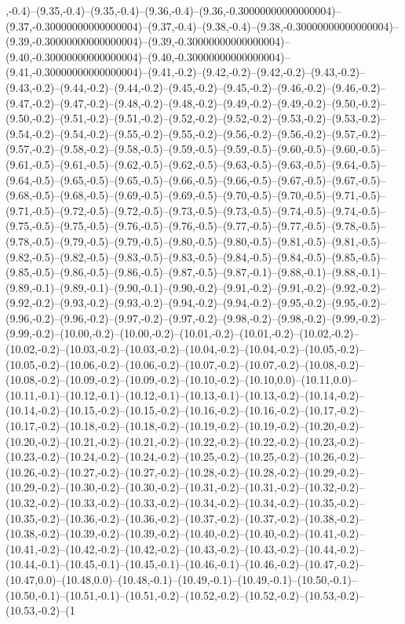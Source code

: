 ,-0.4)--(9.35,-0.4)--(9.35,-0.4)--(9.36,-0.4)--(9.36,-0.30000000000000004)--(9.37,-0.30000000000000004)--(9.37,-0.4)--(9.38,-0.4)--(9.38,-0.30000000000000004)--(9.39,-0.30000000000000004)--(9.39,-0.30000000000000004)--(9.40,-0.30000000000000004)--(9.40,-0.30000000000000004)--(9.41,-0.30000000000000004)--(9.41,-0.2)--(9.42,-0.2)--(9.42,-0.2)--(9.43,-0.2)--(9.43,-0.2)--(9.44,-0.2)--(9.44,-0.2)--(9.45,-0.2)--(9.45,-0.2)--(9.46,-0.2)--(9.46,-0.2)--(9.47,-0.2)--(9.47,-0.2)--(9.48,-0.2)--(9.48,-0.2)--(9.49,-0.2)--(9.49,-0.2)--(9.50,-0.2)--(9.50,-0.2)--(9.51,-0.2)--(9.51,-0.2)--(9.52,-0.2)--(9.52,-0.2)--(9.53,-0.2)--(9.53,-0.2)--(9.54,-0.2)--(9.54,-0.2)--(9.55,-0.2)--(9.55,-0.2)--(9.56,-0.2)--(9.56,-0.2)--(9.57,-0.2)--(9.57,-0.2)--(9.58,-0.2)--(9.58,-0.5)--(9.59,-0.5)--(9.59,-0.5)--(9.60,-0.5)--(9.60,-0.5)--(9.61,-0.5)--(9.61,-0.5)--(9.62,-0.5)--(9.62,-0.5)--(9.63,-0.5)--(9.63,-0.5)--(9.64,-0.5)--(9.64,-0.5)--(9.65,-0.5)--(9.65,-0.5)--(9.66,-0.5)--(9.66,-0.5)--(9.67,-0.5)--(9.67,-0.5)--(9.68,-0.5)--(9.68,-0.5)--(9.69,-0.5)--(9.69,-0.5)--(9.70,-0.5)--(9.70,-0.5)--(9.71,-0.5)--(9.71,-0.5)--(9.72,-0.5)--(9.72,-0.5)--(9.73,-0.5)--(9.73,-0.5)--(9.74,-0.5)--(9.74,-0.5)--(9.75,-0.5)--(9.75,-0.5)--(9.76,-0.5)--(9.76,-0.5)--(9.77,-0.5)--(9.77,-0.5)--(9.78,-0.5)--(9.78,-0.5)--(9.79,-0.5)--(9.79,-0.5)--(9.80,-0.5)--(9.80,-0.5)--(9.81,-0.5)--(9.81,-0.5)--(9.82,-0.5)--(9.82,-0.5)--(9.83,-0.5)--(9.83,-0.5)--(9.84,-0.5)--(9.84,-0.5)--(9.85,-0.5)--(9.85,-0.5)--(9.86,-0.5)--(9.86,-0.5)--(9.87,-0.5)--(9.87,-0.1)--(9.88,-0.1)--(9.88,-0.1)--(9.89,-0.1)--(9.89,-0.1)--(9.90,-0.1)--(9.90,-0.2)--(9.91,-0.2)--(9.91,-0.2)--(9.92,-0.2)--(9.92,-0.2)--(9.93,-0.2)--(9.93,-0.2)--(9.94,-0.2)--(9.94,-0.2)--(9.95,-0.2)--(9.95,-0.2)--(9.96,-0.2)--(9.96,-0.2)--(9.97,-0.2)--(9.97,-0.2)--(9.98,-0.2)--(9.98,-0.2)--(9.99,-0.2)--(9.99,-0.2)--(10.00,-0.2)--(10.00,-0.2)--(10.01,-0.2)--(10.01,-0.2)--(10.02,-0.2)--(10.02,-0.2)--(10.03,-0.2)--(10.03,-0.2)--(10.04,-0.2)--(10.04,-0.2)--(10.05,-0.2)--(10.05,-0.2)--(10.06,-0.2)--(10.06,-0.2)--(10.07,-0.2)--(10.07,-0.2)--(10.08,-0.2)--(10.08,-0.2)--(10.09,-0.2)--(10.09,-0.2)--(10.10,-0.2)--(10.10,0.0)--(10.11,0.0)--(10.11,-0.1)--(10.12,-0.1)--(10.12,-0.1)--(10.13,-0.1)--(10.13,-0.2)--(10.14,-0.2)--(10.14,-0.2)--(10.15,-0.2)--(10.15,-0.2)--(10.16,-0.2)--(10.16,-0.2)--(10.17,-0.2)--(10.17,-0.2)--(10.18,-0.2)--(10.18,-0.2)--(10.19,-0.2)--(10.19,-0.2)--(10.20,-0.2)--(10.20,-0.2)--(10.21,-0.2)--(10.21,-0.2)--(10.22,-0.2)--(10.22,-0.2)--(10.23,-0.2)--(10.23,-0.2)--(10.24,-0.2)--(10.24,-0.2)--(10.25,-0.2)--(10.25,-0.2)--(10.26,-0.2)--(10.26,-0.2)--(10.27,-0.2)--(10.27,-0.2)--(10.28,-0.2)--(10.28,-0.2)--(10.29,-0.2)--(10.29,-0.2)--(10.30,-0.2)--(10.30,-0.2)--(10.31,-0.2)--(10.31,-0.2)--(10.32,-0.2)--(10.32,-0.2)--(10.33,-0.2)--(10.33,-0.2)--(10.34,-0.2)--(10.34,-0.2)--(10.35,-0.2)--(10.35,-0.2)--(10.36,-0.2)--(10.36,-0.2)--(10.37,-0.2)--(10.37,-0.2)--(10.38,-0.2)--(10.38,-0.2)--(10.39,-0.2)--(10.39,-0.2)--(10.40,-0.2)--(10.40,-0.2)--(10.41,-0.2)--(10.41,-0.2)--(10.42,-0.2)--(10.42,-0.2)--(10.43,-0.2)--(10.43,-0.2)--(10.44,-0.2)--(10.44,-0.1)--(10.45,-0.1)--(10.45,-0.1)--(10.46,-0.1)--(10.46,-0.2)--(10.47,-0.2)--(10.47,0.0)--(10.48,0.0)--(10.48,-0.1)--(10.49,-0.1)--(10.49,-0.1)--(10.50,-0.1)--(10.50,-0.1)--(10.51,-0.1)--(10.51,-0.2)--(10.52,-0.2)--(10.52,-0.2)--(10.53,-0.2)--(10.53,-0.2)--(1